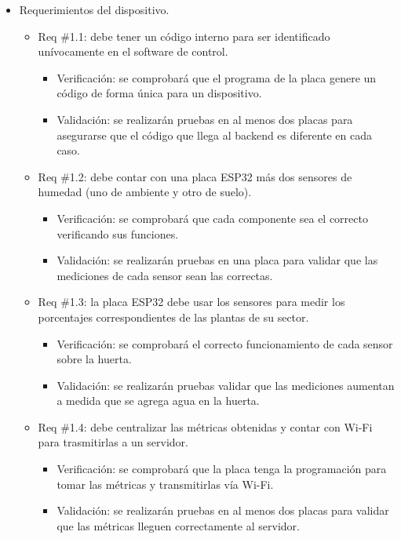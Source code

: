 \documentclass[
11pt, %
codirector, %
]{charter}
\begin{document}
\begin{itemize}
\item Requerimientos del dispositivo.
	\begin{itemize}
	\item Req \#1.1: debe tener un código interno para ser identificado unívocamente en el software de control.
		\begin{itemize}
		\item Verificación: se comprobará que el programa de la placa genere un código de forma única para un dispositivo.
		\item Validación: se realizarán pruebas en al menos dos placas para asegurarse que el código que llega al backend es diferente en cada caso.\\
		\end{itemize}
		
	\item Req \#1.2: debe contar con una placa ESP32 más dos sensores de humedad (uno de ambiente y otro de suelo).
		\begin{itemize}
		\item Verificación: se comprobará que cada componente sea el correcto verificando sus funciones.
		\item Validación: se realizarán pruebas en una placa para validar que las mediciones de cada sensor sean las correctas.\\
		\end{itemize}
		
	\item Req \#1.3: la placa ESP32 debe usar los sensores para medir los porcentajes correspondientes de las plantas de su sector.
		\begin{itemize}
		\item Verificación: se comprobará el correcto funcionamiento de cada sensor sobre la huerta.
		\item Validación: se realizarán pruebas validar que las mediciones aumentan a medida que se agrega agua en la huerta.\\
		\end{itemize}
		 
	\item Req \#1.4: debe centralizar las métricas obtenidas y contar con Wi-Fi para trasmitirlas a un servidor.
		\begin{itemize}
		\item Verificación: se comprobará que la placa tenga la programación para tomar las métricas y transmitirlas vía Wi-Fi.
		\item Validación: se realizarán pruebas en al menos dos placas para validar que las métricas lleguen correctamente al servidor.\\
		\end{itemize}
		 

\end{itemize}
\end{itemize}
\end{document}
